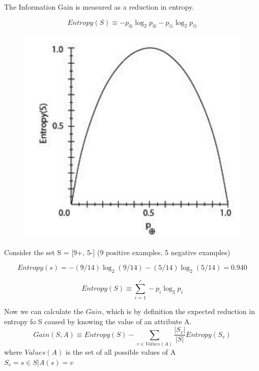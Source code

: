 The Information Gain is measured as a reduction in entropy.

\begin{equation}
    Entropy(S) \equiv -p_{\oplus} \log_{2}p_{\oplus} - p_{\ominus} \log_{2}p_{\ominus}
\end{equation}

\begin{figure}[H]
    \centering
    \includegraphics[width=12cm]{images/Decision Trees/Screenshot_20221004_143301.png}
    \caption{}
    \label{fig:image2.4}
\end{figure}

Consider the set S = [9+, 5-] (9 positive examples, 5 negative examples)

\[Entropy(s) = -(9/14)\log_{2}(9/14) -(5/14)\log_{2}(5/14) = 0.940\]


\begin{equation}
    Entropy(S) \equiv \sum_{i=1}^{c}-p_{i}\log_{2}p_{i}
\end{equation}

Now we can calculate the $Gain$, which is by definition the expected reduction in entropy fo S caused by knowing the value of an attribute A.
\begin{equation}
    Gain(S,A) \equiv Entropy(S) - \sum_{v \in Values(A)} \frac{|S_{v}|}{|S|}Entropy(S_v)
\end{equation}
where $Values(A)$ is the set of all possible values of A \\
$S_{v} = {s \in S | A(s) = v}$

